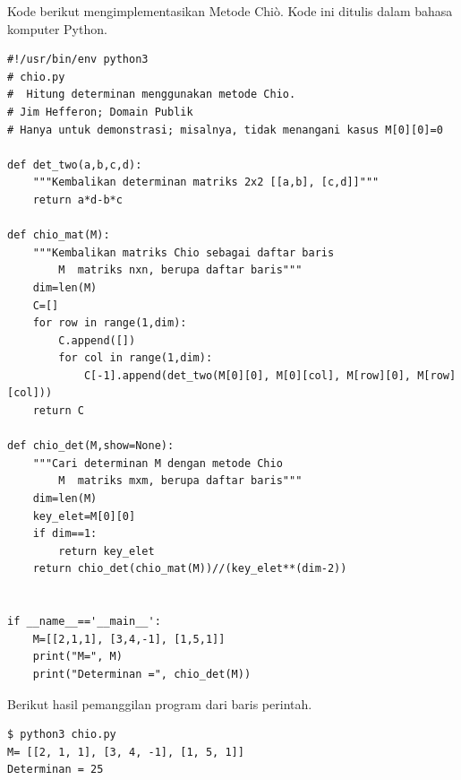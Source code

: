 \announcecomputercode
Kode berikut mengimplementasikan Metode Chi\`o.
Kode ini ditulis dalam bahasa komputer Python.
\begin{lstlisting}
#!/usr/bin/env python3
# chio.py
#  Hitung determinan menggunakan metode Chio.
# Jim Hefferon; Domain Publik
# Hanya untuk demonstrasi; misalnya, tidak menangani kasus M[0][0]=0

def det_two(a,b,c,d):
    """Kembalikan determinan matriks 2x2 [[a,b], [c,d]]"""
    return a*d-b*c

def chio_mat(M):
    """Kembalikan matriks Chio sebagai daftar baris
        M  matriks nxn, berupa daftar baris"""
    dim=len(M)
    C=[]
    for row in range(1,dim):
        C.append([])
        for col in range(1,dim):  
            C[-1].append(det_two(M[0][0], M[0][col], M[row][0], M[row][col]))
    return C

def chio_det(M,show=None):
    """Cari determinan M dengan metode Chio
        M  matriks mxm, berupa daftar baris"""
    dim=len(M)
    key_elet=M[0][0]
    if dim==1:
        return key_elet
    return chio_det(chio_mat(M))//(key_elet**(dim-2))


if __name__=='__main__':
    M=[[2,1,1], [3,4,-1], [1,5,1]]
    print("M=", M)
    print("Determinan =", chio_det(M))
\end{lstlisting}
Berikut hasil pemanggilan program dari baris perintah.
\begin{lstlisting}
$ python3 chio.py
M= [[2, 1, 1], [3, 4, -1], [1, 5, 1]]
Determinan = 25
\end{lstlisting}
\endinput

